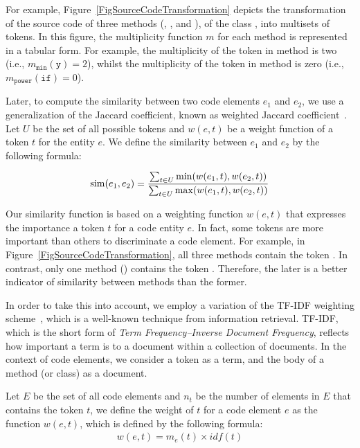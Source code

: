 For example, Figure~\ref{FigSourceCodeTransformation} depicts the transformation of the source code of three methods (, , and ), of the class , into multisets of tokens. In this figure, the multiplicity function $m$ for each method is represented in a tabular form. For example, the multiplicity of the token  in method  is two (i.e., $m_{\mathtt{min}}(\mathtt{y}) = 2$), whilst the multiplicity of the token  in method  is zero (i.e., $m_{\mathtt{power}}(\mathtt{if}) = 0$).


Later, to compute the similarity between two code elements $e_1$ and $e_2$, we use a generalization of the Jaccard coefficient, known as weighted Jaccard coefficient~\cite{chierichetti2010finding}.
Let $U$ be the set of all possible tokens and $w(e, t)$ be a weight function of a token $t$ for the entity $e$.
We define the similarity between $e_1$ and $e_2$ by the following formula:


\begin{align}
\operatorname{sim}(e_1, e_2) = \frac{\sum_{t \in U} \min(w(e_1, t), w(e_2, t))}
                        {\sum_{t \in U} \max(w(e_1, t), w(e_2, t))}
\end{align}


Our similarity function is based on a weighting function $w(e, t)$ that expresses the importance a token $t$ for a code entity $e$.
In fact, some tokens are more important than others to discriminate a code element.
For example, in Figure~\ref{FigSourceCodeTransformation}, all three methods contain the token . In contrast, only one method () contains the token . Therefore, the later is a better indicator of similarity between methods than the former.

In order to take this into account, we employ a variation of the TF-IDF weighting scheme~\cite{salton1986introduction}, which is a well-known technique from information retrieval.
TF-IDF, which is the short form of \emph{Term Frequency–Inverse Document Frequency}, reflects how important a term is to a document within a collection of documents.
In the context of code elements, we consider a token as a term, and the body of a method (or class) as a document.

Let $E$ be the set of all code elements and $n_t$ be the number of elements in $E$ that contains the token $t$,
we define the weight of $t$ for a code element $e$ as the function $w(e, t)$, which is defined by the following formula:
\begin{align}
w(e, t) = m_e(t) \times \mathit{idf}(t)
\end{align}

